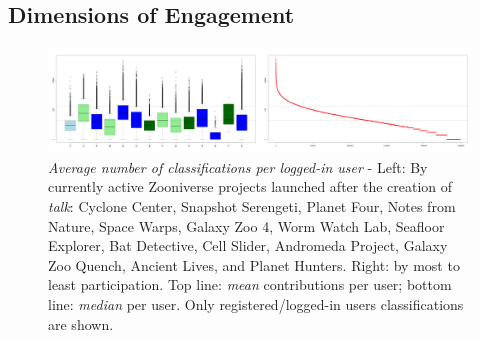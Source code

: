 \documentclass{sigchi}
\begin{document}



\subsection{Dimensions of Engagement}

\begin{figure}[htbp]
\centering
\includegraphics[width=1.0\textwidth]{imgs/engagement_sum_median_mean_width.png}
\caption{\emph{Average number of classifications per logged-in user} - Left: By currently active Zooniverse projects launched after the creation of \emph{talk}: Cyclone Center, Snapshot Serengeti, Planet Four, Notes from Nature, Space Warps, Galaxy Zoo 4, Worm Watch Lab, Seafloor Explorer, Bat Detective, Cell Slider, Andromeda Project, Galaxy Zoo Quench, Ancient Lives, and Planet Hunters. Right: by most to least participation. Top line: \emph{mean} contributions per user; bottom line: \emph{median} per user. Only registered/logged-in users classifications are shown.}
\label{fig:cpu}
\end{figure}
\end{document}
